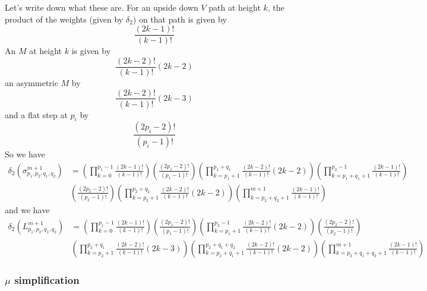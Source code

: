 \documentclass[11pt]{article}
\theoremstyle{definition}
\theoremstyle{definition}
\theoremstyle{plain}
\theoremstyle{plain}
\theoremstyle{plain}
\theoremstyle{definition}
\begin{document}
Let's write down what these are. For an upside down $V$ path at height $k$, the product of the weights (given by $\delta_2$) on that path is given by
\begin{equation*}
\frac{(2k-1)!}{(k-1)!}
\end{equation*}
An $M$ at height $k$ is given by
\begin{equation*}
\frac{(2k-2)!}{(k-1)!}(2k-2)
\end{equation*}
an asymmetric $M$ by
\begin{equation*}
\frac{(2k-2)!}{(k-1)!}(2k-3)
\end{equation*}
and a flat step at $p_i$ by
\begin{equation*}
\frac{(2p_i-2)!}{(p_i-1)!}
\end{equation*}
So we have
\begin{align*}
\delta_2\left(\sigma^{m+1}_{p_1,p_2,q_1,q_2}\right) &= \left(\prod\limits_{k=0}^{p_1-1}\frac{(2k-1)!}{(k-1)!}\right)\left(\frac{(2p_1-2)!}{(p_1-1)!}\right)\left(\prod\limits_{k=p_1+1}^{p_1+q_1}\frac{(2k-2)!}{(k-1)!}(2k-2)\right)\left(\prod\limits_{k=p_1+q_1+1}^{p_2-1}\frac{(2k-1)!}{(k-1)!}\right) \\
&\left(\frac{(2p_2-2)!}{(p_2-1)!}\right)\left(\prod\limits_{k=p_2+1}^{p_2+q_2}\frac{(2k-2)!}{(k-1)!}(2k-2)\right)\left(\prod\limits_{k=p_2+q_2+1}^{m+1}\frac{(2k-1)!}{(k-1)!}\right)
\end{align*}
and we have
\begin{align*}
\delta_2\left(L^{m+1}_{p_1,p_2,q_1,q_2}\right) &= \left(\prod\limits_{k=0}^{p_1-1}\frac{(2k-1)!}{(k-1)!}\right)\left(\frac{(2p_1-2)!}{(p_1-1)!}\right)\left(\prod\limits_{k=p_1+1}^{p_2-1}\frac{(2k-2)!}{(k-1)!}(2k-2)\right)\left(\frac{(2p_2-2)!}{(p_2-1)!}\right) \\
&\left(\prod\limits_{k=p_2+1}^{p_2+q_1}\frac{(2k-2)!}{(k-1)!}(2k-3)\right)\left(\prod\limits_{k=p_2+q_1+1}^{p_2+q_1+q_2}\frac{(2k-2)!}{(k-1)!}(2k-2)\right)\left(\prod\limits_{k=p_2+q_1+q_2+1}^{m+1}\frac{(2k-1)!}{(k-1)!}\right)
\end{align*}

\subsubsection*{$\mu$ simplification}
\end{document}
